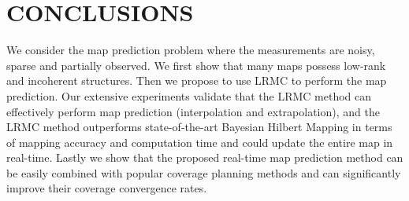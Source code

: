 \section{CONCLUSIONS}
We consider the map prediction problem where the measurements are noisy, sparse and partially observed. We first show that many maps possess low-rank and incoherent structures. Then we propose to use LRMC to perform the map prediction. Our extensive experiments validate that the LRMC method can effectively perform map prediction (interpolation and extrapolation), and the LRMC method outperforms  state-of-the-art Bayesian Hilbert Mapping in terms of mapping accuracy and computation time and could update the entire map in real-time. Lastly we show that the proposed real-time map prediction method can be easily combined with popular coverage planning methods and can significantly improve their coverage convergence rates.